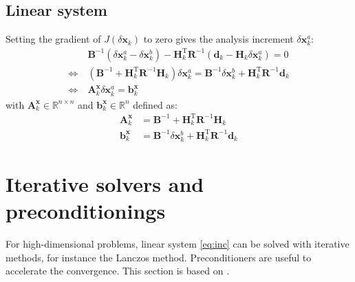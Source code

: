 \documentclass[12pt]{scrartcl}
\begin{document}
\subsection{Linear system}
Setting the gradient of $J(\delta \mathbf{x}_k)$ to zero gives the analysis increment $\delta \mathbf{x}^a_k$:
\begin{align}
\label{eq:inc}
& \ \mathbf{B}^{-1} \left(\delta \mathbf{x}^a_k - \delta \mathbf{x}^b_k\right) - \mathbf{H}_k^\mathrm{T} \mathbf{R}^{-1} \left(\mathbf{d}_k - \mathbf{H}_k \delta \mathbf{x}^a_k\right) = 0 \nonumber \\
\Leftrightarrow & \ \left(\mathbf{B}^{-1} + \mathbf{H}_k^\mathrm{T} \mathbf{R}^{-1} \mathbf{H}_k\right) \delta \mathbf{x}^a_k = \mathbf{B}^{-1} \delta \mathbf{x}^b_k + \mathbf{H}_k^\mathrm{T} \mathbf{R}^{-1} \mathbf{d}_k \nonumber \\
\Leftrightarrow & \ \mathbf{A}^\mathbf{x}_k \delta \mathbf{x}^a_k = \mathbf{b}^\mathbf{x}_k
\end{align}
with $\mathbf{A}^\mathbf{x}_k \in \mathbb{R}^{n \times n}$ and $\mathbf{b}^\mathbf{x}_k \in \mathbb{R}^{n}$ defined as:
\begin{align}
\mathbf{A}^\mathbf{x}_k & = \mathbf{B}^{-1} + \mathbf{H}_k^\mathrm{T} \mathbf{R}^{-1} \mathbf{H}_k \\
\mathbf{b}^\mathbf{x}_k & = \mathbf{B}^{-1} \delta \mathbf{x}^b_k + \mathbf{H}_k^\mathrm{T} \mathbf{R}^{-1} \mathbf{d}_k
\end{align}




\section{Iterative solvers and preconditionings}
For high-dimensional problems, linear system \eqref{eq:inc} can be solved with iterative methods, for instance the Lanczos method. Preconditioners are useful to accelerate the convergence. This section is based on \citet{gurol_phd_2013}.
\end{document}
